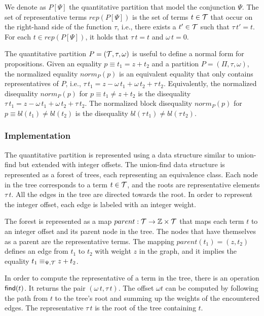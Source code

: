 We denote as $P[\Psi]$ the quantitative partition that model the conjunction $\Psi$.
The set of representative terms $rep(P[\Psi])$ is the set of terms $t \in \mathcal{T}$ that occur on the right-hand side of the function $\tau$, i.e., there exists a $t'\in \mathcal{T}$ such that $\tau\,t' = t$.
For each $t\in rep(P[\Psi])$, it holds that $\tau\,t=t$ and $\omega\,t = 0$.

The quantitative partition $P = (\mathcal{T}, \tau, \omega)$ is useful to define a normal form for propositions.
Given an equality $p \equiv t_1 = z + t_2$ and a partition $P = (\Pi, \tau, \omega)$,
the normalized equality $norm_P(p)$ is an equivalent equality that only contains representatives of $P$,
i.e., $\tau\,t_1 = z - \omega\,t_1 + \omega\,t_2 + \tau\,t_2$.
Equivalently, the normalized disequality $norm_P(p)$ for $p \equiv t_1 \neq z + t_2$ is the disequality $\tau\,t_1 = z - \omega\,t_1 + \omega\,t_2 + \tau\,t_2$.
The normalized block disequality $norm_P(p)$ for $p \equiv bl(t_1) \neq bl(t_2)$ is the disequality $bl(\tau\,t_1) \neq bl(\tau\,t_2)$.

\subsubsection{Implementation}

The quantitative partition is represented using a data structure similar to union-find but extended with integer offsets.
The union-find data structure is represented as a forest of trees, each representing an equivalence class.
Each node in the tree corresponds to a term $t \in \mathcal{T}$, and the roots are representative elements $\tau\,t$. \cite{uf-tarjan}
All the edges in the tree are directed towards the root.
In order to represent the integer offset, each edge is labeled with an integer weight.

The forest is represented as a map $parent : \mathcal{T} \rightarrow \mathbb{Z} \times \mathcal{T}$ that maps each term $t$ to an integer offset and its parent node in the tree.
The nodes that have themselves as a parent are the representative terms.
The mapping $parent(t_1) = (z,t_2)$ defines an edge from $t_1$ to $t_2$ with weight $z$ in the graph, and it implies the equality $t_1 \equiv_{\Psi,\mathcal{T}} z + t_2$.

In order to compute the representative of a term in the tree, there is an operation $\textsf{find}(t)$.
It returns the pair $(\omega\,t,\tau\,t)$.
The offset $\omega t$ can be computed by following the path from $t$ to the tree's root and summing up the weights of the encountered edges.
The representative $\tau\,t$ is the root of the tree containing $t$.

